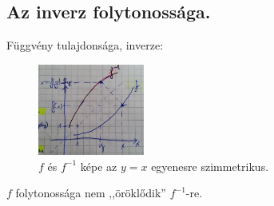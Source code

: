 \documentclass[a4paper,11.5pt]{article}
\begin{document}
	\subsection{Az inverz folytonossága.}
	\begin{revision}
			
		Függvény tulajdonsága, inverze:
		
		\begin{figure}[H]
			\centering
			\includegraphics[height=3cm]{kepek/inverse_function.jpg}
			\caption{$f$ és $f^{-1}$ képe az $y=x$ egyenesre szimmetrikus.}\label{fig_emlekezteto_inverz}
		\end{figure}
		\begin{note}
			$f$ folytonossága nem ,,öröklődik'' $f^{-1}$-re.
		\end{note}
	\end{revision}
\end{document}
